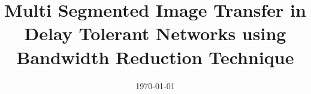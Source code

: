 \documentclass[a4paper, 12pt, twoside]{synopsis}  %
\begin{document}
\title  {Multi Segmented Image Transfer in Delay Tolerant Networks using Bandwidth Reduction Technique}
\addresses  {\groupname\\\deptname\\\univname}  %
\date       {\today}
\subject    {}
\keywords   {}

\maketitle



\pagestyle{plain}  %


\end{document}
